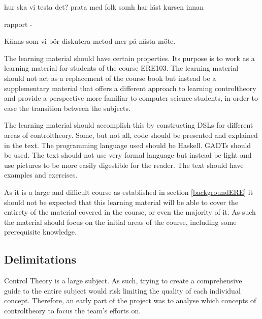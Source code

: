 hur ska vi testa det?
prata med folk somh har läst kursen innan 

rapport - 


Känns som vi bör diskutera metod mer på nästa möte.
\fi

\iffalse
Metod/Genomförande
Hur gruppen tänkt sig att genomföra arbetet Olika deluppgifter/delstudier kräver ofta separata metodavsnitt.

Metodbeskrivningen förankras vanligen i metodlitteratur. 

Detta är typiskt ett avsnitt som uppdateras under arbetets gång
\fi

The learning material should have certain properties. Its purpose is to work as a learning material for students of the course \gls{ERE103}. 
The learning material should not act as a replacement of the course book but instead be a supplementary material that offers a different approach to learning \gls{controltheory} and provide a perspective more familiar to computer science students, in order to ease the transition between the subjects.

The learning material should accomplish this by constructing \gls{DSL}s for different areas of \gls{controltheory}. Some, but not all, code should be presented and explained in the text. The programming language used should be \gls{Haskell}. \gls{GADTs} should be used. The text should not use very formal language but instead be light and use pictures to be more easily digestible for the reader. The text should have examples and exercises.

As it is a large and difficult course as established in section \ref{backgroundERE} it should not be expected that this learning material will be able to cover the entirety of the material covered in the course, or even the majority of it. As such the material should focus on the initial areas of the course, including some prerequisite knowledge. 






\subsection{Delimitations}\label{sec:delimitation}
Control Theory is a large subject. As such, trying to create a comprehensive guide to the entire subject would risk limiting the quality of each individual concept. Therefore, an early part of the project was to analyse which concepts of \gls{controltheory} to focus the team's efforts on. %



